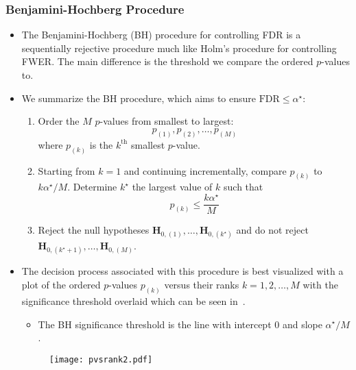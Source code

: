 \subsubsection*{Benjamini-Hochberg Procedure}
\begin{itemize}
      \item The Benjamini-Hochberg (BH) procedure for controlling FDR is a sequentially rejective procedure
            much like Holm's procedure for controlling FWER\@. The main difference is the threshold we
            compare the ordered $ p $-values to.
      \item We summarize the BH procedure, which aims to ensure $ \text{FDR}\le \alpha^\star $:
            \begin{framed}
                  \begin{enumerate}
                        \item Order the $M$ $p$-values from smallest to largest:
                              \[ p_{(1)},p_{(2)},\ldots,p_{(M)} \]
                              where $ p_{(k)} $ is the $ k^{\text{th}} $ smallest $ p $-value.
                        \item Starting from $ k=1 $ and continuing incrementally, compare
                              $ p_{(k)} $ to $ k\alpha^\star/M $. Determine $ k^\star $
                              the largest value of $ k $ such that
                              \[ p_{(k)}\le \frac{k\alpha^\star}{M}  \]
                        \item Reject the null hypotheses $ \mathbf{H}_{0,(1)},\ldots,\mathbf{H}_{0,(k^\star)} $
                              and do not reject $ \mathbf{H}_{0,(k^\star+1)},\ldots,\mathbf{H}_{0,(M)} $.
                  \end{enumerate}
            \end{framed}
      \item The decision process associated with this procedure is best visualized with a plot of the ordered $p$-values
            $ p_{(k)} $ versus their ranks $ k=1,2,\ldots,M $ with the significance threshold overlaid which can
            be seen in~.
            \begin{itemize}
                  \item The BH significance threshold is the line with intercept $0$ and slope $ \alpha^\star/M $.
            \end{itemize}
            \begin{figure}[!htbp]
                  \centering
                  \texttt{[image: pvsrank2.pdf]}

\end{figure}
\end{itemize}
